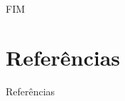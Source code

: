 \documentclass[aspectraio=169,8pt,slidestop,xcolor=table]{beamer}
\begin{document}
\begin{frame}{FIM}
\vspace{3cm}
\begin{center}
\end{center}

\end{frame}


\section{Referências}


\begin{frame}[allowframebreaks]{Referências}
	
	
\end{frame}
\end{document}

